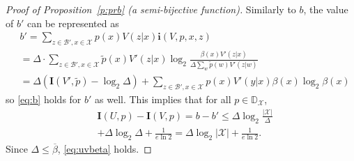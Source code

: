 \documentclass[10pt,a4paper]{amsart}
\newcommand{\bD}{{\mathbb{D}}}
\newcommand{\bfI}{{\mathbf{I}}}
\newcommand{\bi}{\mathbf{i}}
\newcommand{\br}[1]{{\left({#1}\right)}}
\newcommand{\mB}{{\mathcal{B}}}
\newcommand{\mX}{{\mathcal{X}}}
\newcommand{\obeta}{\overline{\beta}}
\newcommand{\tp}{{\widetilde{p}}}
\begin{document}
\begin{proof}[Proof of Proposition~\ref{p:prb} (a semi-bijective function)]
Similarly to $b$, the value of $b'$ can be represented as
\begin{align*}
&b'=\sum_{z\in \mB',x\in\mX}p(x) V(z|x)\bi(V,p,x,z)
\\&=\Delta\cdot\!\!\sum_{z\in\mB',x\in\mX}\tp(x)V'(z|x)\log_2\frac{\beta(x)V'(z|x)}{\Delta\sum_w \tp(w)V'(z|w)}
\\&
= \Delta\br{\bfI(V',\tp)-\log_2 \Delta}+\!\!\!\!\!\sum_{z\in\mB',x\in\mX}\!\!\!\!\!p(x)V'(y|x)\beta(x)\log_2 \beta(x)
\end{align*}
so \eqref{eq:b} holds for $b'$ as well.
This implies that for all $p\in\bD_\mX$,
\begin{align}
&\bfI(U,p)-\bfI(V,p) = b-b' \leq 
\Delta \log_2\frac{|\mX|}{\Delta}
\nonumber\\&+\Delta\log_2\Delta+\frac{1}{e\ln 2}
=\Delta \log_2|\mX|+\frac{1}{e\ln 2}.
\end{align}
Since $\Delta\leq \obeta$, \eqref{eq:uvbeta} holds.
\end{proof}
\end{document}
